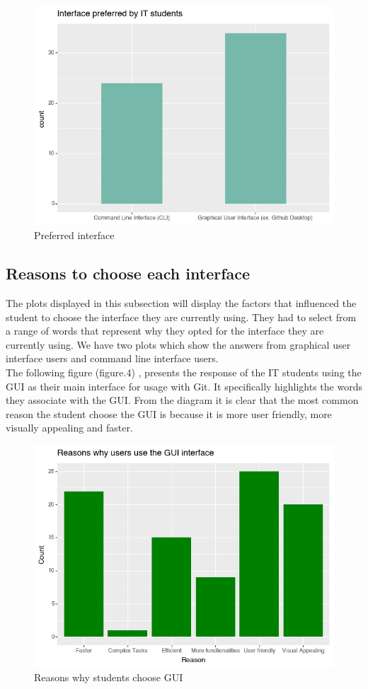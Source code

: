 \documentclass[]{report}
\begin{document}
	
	\begin{figure}[H]
		\centering
		\includegraphics[width=0.75\linewidth]{preferredInterface}
		\caption{Preferred interface}
		\label{fig: 3}
	\end{figure}
	
	\subsection{Reasons to choose each interface}
	The plots displayed in this subsection will display the factors that influenced the student to choose the interface they are currently using. They had to select from a range of words that represent why they opted for the interface they are currently using. We have two plots which show the answers from graphical user interface users and command line interface users. \\
	
	The following figure (figure.4) , presents the response of the IT students using the GUI as their main interface for usage with Git. It specifically highlights the words they associate with the GUI. From the diagram it is clear that the most common reason the student choose the GUI is because it is more user friendly, more visually appealing and faster.
	
		\begin{figure}[H]
		\centering
		\includegraphics[width=0.75\linewidth]{ReasonsGUI}
		\caption{Reasons why students choose GUI}
		\label{fig: 4}
	\end{figure}
	
\end{document}
